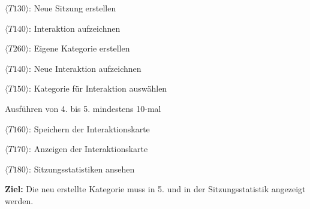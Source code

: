         \begin{test10}
            \item $\langle T130 \rangle$: Neue Sitzung erstellen
            \item $\langle T140 \rangle$: Interaktion aufzeichnen
            \item $\langle T260 \rangle$: Eigene Kategorie erstellen
            \item $\langle T140 \rangle$: Neue Interaktion aufzeichnen
            \item $\langle T150 \rangle$: Kategorie für Interaktion auswählen
            \item Ausführen von 4. bis 5. mindestens 10-mal
            \item $\langle T160 \rangle$: Speichern der Interaktionskarte
            \item $\langle T170 \rangle$: Anzeigen der Interaktionskarte
            \item $\langle T180 \rangle$: Sitzungsstatistiken ansehen
        \end{test10}
        
        \textbf{\sffamily Ziel:} Die neu erstellte Kategorie muss in 5. und in der Sitzungsstatistik angezeigt werden.
        
    
    
   